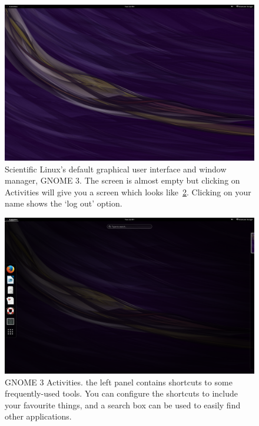 \begin{figure}[t]
\centerline{\includegraphics[width=16cm]{images/gnome-startup}}
\caption{Scientific Linux's default graphical user interface and
window manager, GNOME 3.
The screen is almost empty but clicking on \protect{} Activities will give you a screen which looks like~\ref{figure:gnome-activities}. Clicking on your name \protect{} shows the `log out'  option.}%
\label{figure:gnome-desktop}
\end{figure}

\begin{figure}[t]
\centerline{\includegraphics[width=16cm]{images/gnome-activities}}
\caption{GNOME 3 Activities. \protect{} the left panel contains
  shortcuts to
  some frequently-used tools. You can  configure the shortcuts
  to include your favourite things, and \protect{} a search box can be used to easily find other applications.}\label{figure:gnome-activities}
\end{figure}

